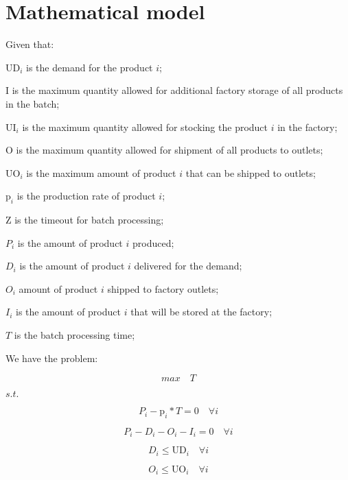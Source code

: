 \documentclass[authoryear,manuscript,12pt]{elsarticle}
\begin{document}
\section{Mathematical model}
\label{sec:mathModel}

Given that:

$\textrm{UD}_i$ is the demand for the product $i$;

$\textrm{I}$ is the maximum quantity allowed for additional factory storage of all products in the batch;

$\textrm{UI}_i$ is the maximum quantity allowed for stocking the product $i$ in the factory;

$\textrm{O}$ is the maximum quantity allowed for shipment of all products to outlets;

$\textrm{UO}_i$ is the maximum amount of product $i$ that can be shipped to outlets;

$\textrm{p}_i$ is the production rate of product $i$;

$\textrm{Z}$ is the timeout for batch processing;

$P_i$ is the amount of product $i$ produced;

$D_i$ is the amount of product $i$ delivered for the demand;

$O_i$ amount of product $i$ shipped to factory outlets;

$I_i$ is the amount of product $i$ that will be stored at the factory;

$T$ is the batch processing time;

We have the problem:

\begin{equation}
\label{MBPTMP01}
max \quad T
\end{equation}

$s.t.$

\begin{equation}
P_i - \textrm{p}_i * T  = 0 \quad \forall i
\end{equation}

\begin{equation}
P_i - D_i - O_i - I_i = 0 \quad \forall i
\end{equation}

\begin{equation}
\label{MBPTMP04}
D_i \leq \textrm{UD}_i \quad \forall i
\end{equation}

\begin{equation}
O_i \leq \textrm{UO}_i \quad \forall i
\end{equation}
\end{document}
